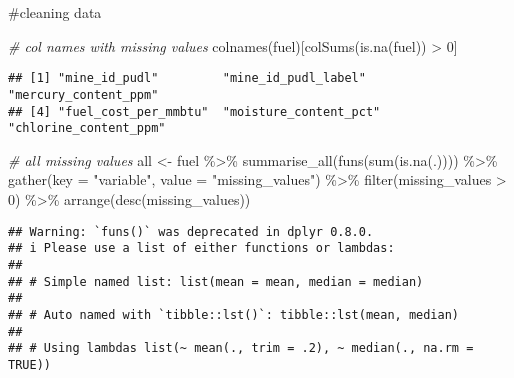 \documentclass[
]{article}
\newenvironment{Shaded}{\begin{snugshade}}{\end{snugshade}}
\newcommand{\AttributeTok}[1]{\textcolor[rgb]{0.77,0.63,0.00}{#1}}
\newcommand{\CommentTok}[1]{\textcolor[rgb]{0.56,0.35,0.01}{\textit{#1}}}
\newcommand{\DecValTok}[1]{\textcolor[rgb]{0.00,0.00,0.81}{#1}}
\newcommand{\FunctionTok}[1]{\textcolor[rgb]{0.00,0.00,0.00}{#1}}
\newcommand{\NormalTok}[1]{#1}
\newcommand{\OtherTok}[1]{\textcolor[rgb]{0.56,0.35,0.01}{#1}}
\newcommand{\SpecialCharTok}[1]{\textcolor[rgb]{0.00,0.00,0.00}{#1}}
\newcommand{\StringTok}[1]{\textcolor[rgb]{0.31,0.60,0.02}{#1}}
\begin{document}
\#cleaning data

\begin{Shaded}
\begin{Highlighting}[]
\CommentTok{\# col names with missing values}
\FunctionTok{colnames}\NormalTok{(fuel)[}\FunctionTok{colSums}\NormalTok{(}\FunctionTok{is.na}\NormalTok{(fuel)) }\SpecialCharTok{\textgreater{}} \DecValTok{0}\NormalTok{]}
\end{Highlighting}
\end{Shaded}

\begin{verbatim}
## [1] "mine_id_pudl"         "mine_id_pudl_label"   "mercury_content_ppm" 
## [4] "fuel_cost_per_mmbtu"  "moisture_content_pct" "chlorine_content_ppm"
\end{verbatim}

\begin{Shaded}
\begin{Highlighting}[]
\CommentTok{\# all missing values}
\NormalTok{all }\OtherTok{\textless{}{-}}\NormalTok{ fuel }\SpecialCharTok{\%\textgreater{}\%}
\FunctionTok{summarise\_all}\NormalTok{(}\FunctionTok{funs}\NormalTok{(}\FunctionTok{sum}\NormalTok{(}\FunctionTok{is.na}\NormalTok{(.)))) }\SpecialCharTok{\%\textgreater{}\%}
\FunctionTok{gather}\NormalTok{(}\AttributeTok{key =} \StringTok{"variable"}\NormalTok{, }\AttributeTok{value =} \StringTok{"missing\_values"}\NormalTok{) }\SpecialCharTok{\%\textgreater{}\%}
\FunctionTok{filter}\NormalTok{(missing\_values }\SpecialCharTok{\textgreater{}} \DecValTok{0}\NormalTok{) }\SpecialCharTok{\%\textgreater{}\%}
\FunctionTok{arrange}\NormalTok{(}\FunctionTok{desc}\NormalTok{(missing\_values))}
\end{Highlighting}
\end{Shaded}

\begin{verbatim}
## Warning: `funs()` was deprecated in dplyr 0.8.0.
## i Please use a list of either functions or lambdas:
## 
## # Simple named list: list(mean = mean, median = median)
## 
## # Auto named with `tibble::lst()`: tibble::lst(mean, median)
## 
## # Using lambdas list(~ mean(., trim = .2), ~ median(., na.rm = TRUE))
\end{verbatim}

\begin{Shaded}
\end{Shaded}
\end{document}
